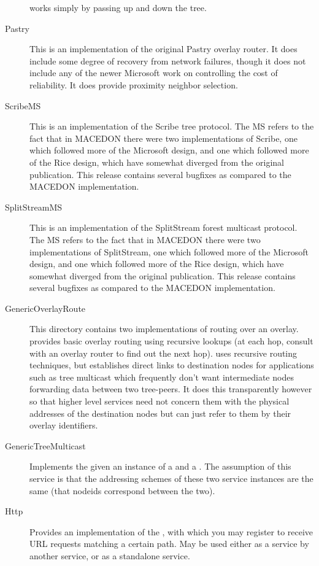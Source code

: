 \begin{description}
  works simply by passing up and down the tree.
\item[Pastry] This is an implementation of the original Pastry overlay router.
  It does include some degree of recovery from network failures, though it does 
  not include any of the newer Microsoft work on controlling the cost of 
  reliability.  It does provide proximity neighbor selection.
\item[ScribeMS] This is an implementation of the Scribe tree 
  protocol.  The MS refers to the fact that in MACEDON there were two
  implementations of Scribe, one which followed more of the Microsoft design,
  and one which followed more of the Rice design, which have somewhat diverged
  from the original publication.  This release contains several bugfixes as
  compared to the MACEDON implementation.
\item[SplitStreamMS] This is an implementation of the SplitStream forest 
  multicast protocol.  The MS refers to the fact that in MACEDON there were
  two implementations of SplitStream, one which followed more of the Microsoft
  design, and one which followed more of the Rice design, which have somewhat
  diverged from the original publication.  This release contains several bugfixes
  as compared to the MACEDON implementation.
\item[GenericOverlayRoute] This directory contains two implementations of routing over an overlay.
   provides basic overlay routing using
  recursive lookups (at each hop, consult with an overlay router to find out
  the next hop).   uses recursive routing
  techniques, but establishes direct links to destination nodes for
  applications such as tree multicast which frequently don't want intermediate
  nodes forwarding data between two tree-peers.  It does this transparently
  however so that higher level services need not concern them with the physical
  addresses of the destination nodes but can just refer to them by their overlay
  identifiers.
\item[GenericTreeMulticast] Implements the 
  given an instance of a  and a .
  The assumption of this service is that the addressing schemes of these two service
  instances are the same (that nodeids correspond between the two).
\item[Http] Provides an implementation of the ,
  with which you may register to receive URL requests matching a certain path.
  May be used either as a service by another service, or as a standalone service.
\end{description}

